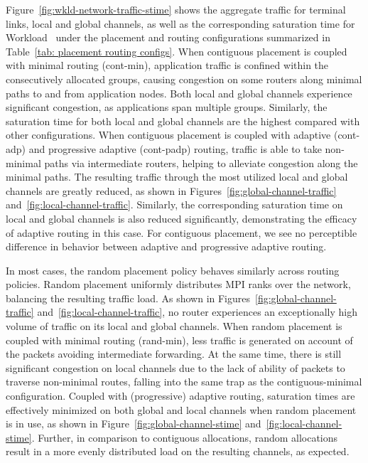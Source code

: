 Figure~\ref{fig:wkld-network-traffic-stime} shows the aggregate traffic for terminal links, local and global channels,
as well as the corresponding saturation time for Workload~ under the placement and routing configurations summarized in Table~\ref{tab: placement routing configs}.
When contiguous placement is coupled with minimal routing (cont-min), 
application traffic is confined within the consecutively allocated groups, 
causing congestion on some routers along minimal paths to and from application nodes. 
Both local and global channels experience significant congestion, as applications span multiple groups.
Similarly, the saturation time for both local and global channels are the highest compared with other configurations.
When contiguous placement is coupled with adaptive (cont-adp) and progressive adaptive (cont-padp) routing, 
traffic is able to take non-minimal paths via intermediate routers, helping to alleviate congestion along the minimal paths. 
The resulting traffic through the most utilized local and global channels are greatly reduced, 
as shown in Figures~\ref{fig:global-channel-traffic} and~\ref{fig:local-channel-traffic}. 
Similarly, the corresponding saturation time on local and global channels is also reduced significantly, 
demonstrating the efficacy of adaptive routing in this case. 
For contiguous placement, we see no perceptible difference in behavior between adaptive and progressive adaptive routing.


In most cases, the random placement policy behaves similarly across routing policies.
Random placement uniformly distributes MPI ranks over the network, 
balancing the resulting traffic load. 
As shown in Figures~\ref{fig:global-channel-traffic} and~\ref{fig:local-channel-traffic}, 
no router experiences an exceptionally high volume of traffic on its local and global channels. 
When random placement is coupled with minimal routing (rand-min), less traffic is generated on account of
the packets avoiding intermediate forwarding. At the same time, there is still significant congestion on local channels due to the lack of ability of packets to traverse non-minimal routes, falling into the same trap as the contiguous-minimal configuration.
Coupled with (progressive) adaptive routing,
saturation times are effectively minimized on both global and local channels when random placement is in use, 
as shown in Figure~\ref{fig:global-channel-stime} and~\ref{fig:local-channel-stime}. Further, in comparison to contiguous allocations, random allocations result in a more evenly distributed load on the resulting channels, as expected.

